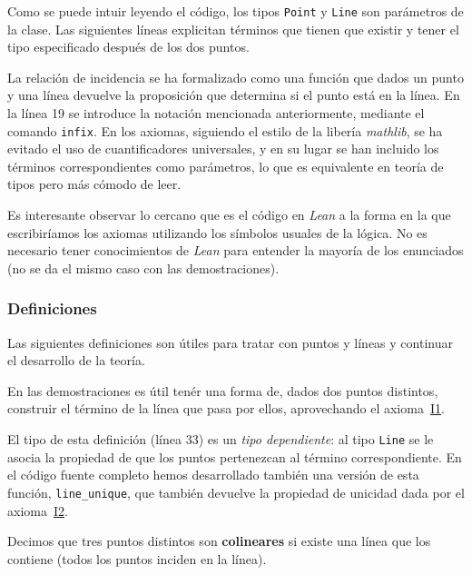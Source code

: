 
Como se puede intuir leyendo el código, los tipos \lstinline{Point} y
\lstinline{Line} son parámetros de la clase. Las siguientes líneas explicitan
términos que tienen que existir y tener el tipo especificado después de los dos
puntos.

La relación de incidencia se ha formalizado como una función que dados un punto
y una línea devuelve la proposición que determina si el punto está en la línea.
En la línea 19 se introduce la notación mencionada anteriormente, mediante el
comando \lstinline{infix}. En los axiomas, siguiendo el estilo de la libería
\textit{mathlib}, se ha evitado el uso de cuantificadores universales, y en su
lugar se han incluido los términos correspondientes como parámetros, lo que es
equivalente en teoría de tipos pero más cómodo de leer.

Es interesante observar lo cercano que es el código en \textit{Lean} a la forma
en la que escribiríamos los axiomas utilizando los símbolos usuales de la
lógica. No es necesario tener conocimientos de \textit{Lean} para entender la
mayoría de los enunciados (no se da el mismo caso con las demostraciones).


\subsubsection{Definiciones}

Las siguientes definiciones son útiles para tratar con puntos y líneas y
continuar el desarrollo de la teoría.

En las demostraciones es útil tenér una forma de, dados dos puntos distintos,
construir el término de la línea que pasa por ellos, aprovechando el
axioma~\hyperref[ax:I1]{I1}.


El tipo de esta definición (línea 33) es un \textit{tipo dependiente}: al tipo
\lstinline{Line} se le asocia la propiedad de que los puntos pertenezcan al
término correspondiente. En el código fuente completo hemos desarrollado también
una versión de esta función, \lstinline{line_unique}, que también devuelve la
propiedad de unicidad dada por el axioma~\hyperref[ax:I2]{I2}.

\begin{defin*}[Colinearidad]
	Decimos que tres puntos distintos son \textbf{colineares} si existe una
	línea que los contiene (todos los puntos inciden en la línea).
\end{defin*}

